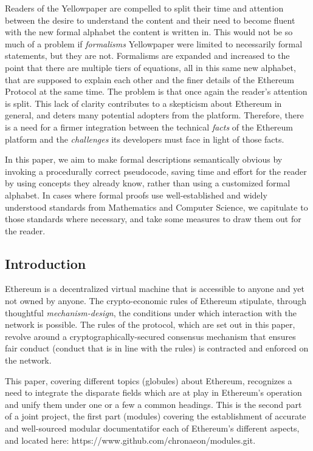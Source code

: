 \documentclass[11pt,a4paper,leqno,bibliography=totoc]{scrartcl}
\newenvironment{alphafootnotes}
    {\par\edef\savedfootnotenumber{\number\value{footnote}}
    \renewcommand{\thefootnote}{\alph{footnote}}
     \setcounter{footnote}{0}}
    {\par\setcounter{footnote}{\savedfootnotenumber}}
\begin{document}
\begin{alphafootnotes}
	  Readers of the Yellowpaper are compelled to split their time and attention between the desire to understand the content and their need to become fluent with the new formal alphabet the content is written in. This would not be so much of a problem if \textit{formalisms} Yellowpaper were limited to necessarily formal statements, but they are not. Formalisms are expanded and increased to the point that there are multiple tiers of equations, all in this same new alphabet, that are supposed to explain each other and the finer details of the Ethereum Protocol at the same time. The problem is that once again the reader's attention is split. This lack of clarity contributes to a skepticism about Ethereum in general, and deters many potential adopters from the platform. Therefore, there is a need for a firmer integration between the technical \textsl{facts} of the Ethereum platform and the \textsl{challenges} its developers must face in light of those facts.
\par

	  In this paper, we aim to make formal descriptions semantically obvious by invoking a procedurally correct pseudocode, saving time and effort for the reader by using concepts they already know, rather than using a customized formal alphabet. In cases where formal proofs use well-established and widely understood standards from Mathematics and Computer Science, we capitulate to those standards where necessary, and take some measures to draw them out for the reader.  
\begin{multicols}{2}
\justify
	\section{Introduction}

	Ethereum is a decentralized virtual machine that is accessible to anyone and yet not owned by anyone. The crypto-economic rules of Ethereum stipulate, through thoughtful \textit{mechanism-design}, the conditions under which interaction with the network is possible. The rules of the protocol, which are set out in this paper, revolve around a cryptographically-secured consensus mechanism that ensures fair conduct (conduct that is in line with the rules) is contracted and enforced on the network. 

	This paper, covering different topics (globules) about Ethereum, recognizes a need to integrate the disparate fields which are at play in Ethereum's operation and unify them under one or a few a common headings. This is the second part of a joint project, the first part (modules) covering the establishment of accurate and well-sourced modular documentatifor each of Ethereum's different aspects, and located here: https://www.github.com/chronaeon/modules.git.



\end{multicols}
\end{alphafootnotes}
\end{document}
